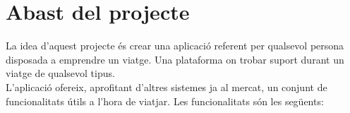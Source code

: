 
\chapter{Abast del projecte} %

\label{Abast} %

La idea d'aquest projecte és crear una aplicació referent per qualsevol persona disposada a emprendre un viatge. Una plataforma on trobar suport durant un viatge de qualsevol tipus.\\

L'aplicació ofereix, aprofitant d'altres sistemes ja al mercat, un conjunt de funcionalitats útils a l'hora de viatjar. Les funcionalitats són les següents:
